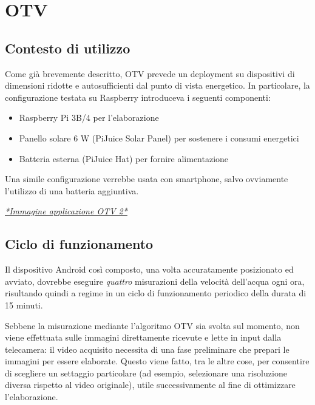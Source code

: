 \chapter{OTV}
\section{Contesto di utilizzo}

Come già brevemente descritto, OTV prevede un deployment su dispositivi di dimensioni ridotte e autosufficienti dal punto di
vista energetico. In particolare, la configurazione testata su Raspberry introduceva i seguenti componenti:
\begin{itemize}
    \item Raspberry Pi 3B/4 per l'elaborazione
    \item Panello solare 6 W (PiJuice Solar Panel) per sostenere i consumi energetici
    \item Batteria esterna (PiJuice Hat) per fornire alimentazione
\end{itemize}
\cite{app11157027} Una simile configurazione verrebbe usata con smartphone, salvo ovviamente l'utilizzo di una batteria 
aggiuntiva.

\underline{\emph{*Immagine applicazione OTV 2*}}

\section{Ciclo di funzionamento}
Il dispositivo Android così composto, una volta accuratamente posizionato ed avviato, dovrebbe eseguire \emph{quattro} misurazioni 
della velocità dell'acqua ogni ora, risultando quindi a regime in un ciclo di funzionamento periodico della durata di 15 minuti.

Sebbene la misurazione mediante l'algoritmo OTV sia svolta sul momento, non viene effettuata sulle immagini direttamente ricevute
e lette in input dalla telecamera: il video acquisito necessita di una fase preliminare che prepari le immagini per essere elaborate.
Questo viene fatto, tra le altre cose, per consentire di scegliere un settaggio particolare (ad esempio, selezionare una 
risoluzione diversa rispetto al video originale), utile successivamente al fine di ottimizzare l'elaborazione.

